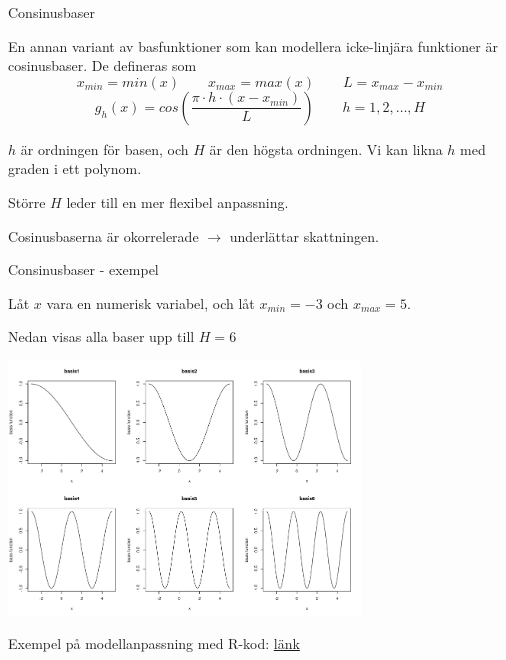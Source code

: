 \documentclass[10pt,english]{beamer}
\begin{document}
\begin{frame}{Consinusbaser}

En annan variant av basfunktioner som kan modellera icke-linjära funktioner
är cosinusbaser. De defineras som 
\[
x_{min}=min\left(x\right)\qquad x_{max}=max\left(x\right)\qquad L=x_{max}-x_{min}
\]
\begin{equation}
g_{h}\left(x\right)=cos\left(\frac{\pi\cdot h\cdot\left(x-x_{min}\right)}{L}\right)\qquad h=1,2,\ldots,H\label{eq:cosine basis}
\end{equation}

$h$ är ordningen för basen, och $H$ är den högsta ordningen. Vi kan likna $h$ med graden i ett polynom.

Större $H$ leder till en mer flexibel anpassning.

Cosinusbaserna är okorrelerade $\rightarrow$ underlättar skattningen.

\end{frame}


\begin{frame}{Consinusbaser - exempel}

Låt $x$ vara en numerisk variabel, och låt $x_{min}=-3$ och $x_{max}=5$. 

Nedan visas alla baser upp till $H=6$

\includegraphics[width=0.7\textwidth]{figs/cosinus_basis_func_example.png}

Exempel på modellanpassning med R-kod: \href{https://raw.githubusercontent.com/STIMALiU/732G57_ML/refs/heads/main/labs/cosinusbaser_exempel.R}{länk}

\end{frame}
\end{document}
